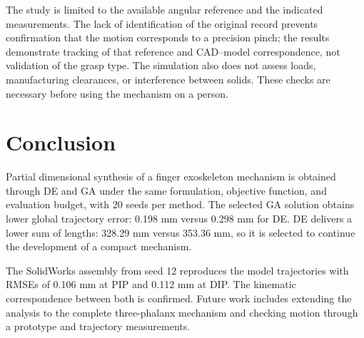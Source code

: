 \documentclass[conference,letterpaper]{IEEEtran}
\begin{document}
The study is limited to the available angular reference and the indicated measurements. The lack of identification of the original record prevents confirmation that the motion corresponds to a precision pinch; the results demonstrate tracking of that reference and CAD--model correspondence, not validation of the grasp type. The simulation also does not assess loads, manufacturing clearances, or interference between solids. These checks are necessary before using the mechanism on a person.

\section{Conclusion}
Partial dimensional synthesis of a finger exoskeleton mechanism is obtained through DE and GA under the same formulation, objective function, and evaluation budget, with 20 seeds per method. The selected GA solution obtains lower global trajectory error: 0.198 mm versus 0.298 mm for DE. DE delivers a lower sum of lengths: 328.29 mm versus 353.36 mm, so it is selected to continue the development of a compact mechanism.

The SolidWorks assembly from seed 12 reproduces the model trajectories with RMSEs of 0.106 mm at PIP and 0.112 mm at DIP. The kinematic correspondence between both is confirmed. Future work includes extending the analysis to the complete three-phalanx mechanism and checking motion through a prototype and trajectory measurements.

\ifdefined\versionciega
\fi
\balance

\end{document}
